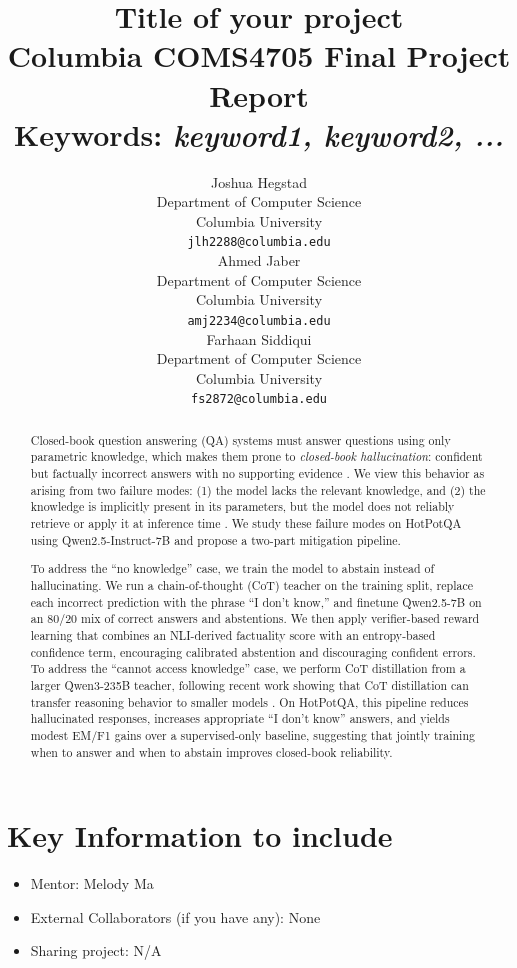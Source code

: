 \documentclass{article}
\title{
  Title of your project \\
  \vspace{1em}
  \small{\normalfont Columbia COMS4705 Final Project Report} \\
  \small{\normalfont \textbf{Keywords:} \textit{keyword1, keyword2, ...}}
}
\author{
  Joshua Hegstad \\
  Department of Computer Science \\
  Columbia University \\
  \texttt{jlh2288@columbia.edu} \\
  \And
  Ahmed Jaber \\
  Department of Computer Science \\
  Columbia University \\
  \texttt{amj2234@columbia.edu} \\
  \And
  Farhaan Siddiqui \\
  Department of Computer Science \\
  Columbia University \\
  \texttt{fs2872@columbia.edu} \\
}
\newcommand{\note}[1]{\textcolor{blue}{{#1}}}
\begin{document}
\maketitle


\begin{abstract}
Closed-book question answering (QA) systems must answer questions using only parametric knowledge, which makes them prone to \emph{closed-book hallucination}: confident but factually incorrect answers with no supporting evidence \cite{ji2023survey}. We view this behavior as arising from two failure modes: (1) the model lacks the relevant knowledge, and (2) the knowledge is implicitly present in its parameters, but the model does not reliably retrieve or apply it at inference time \cite{kadavath2022language,lin2022teaching}. We study these failure modes on HotPotQA using Qwen2.5-Instruct-7B and propose a two-part mitigation pipeline.

To address the ``no knowledge'' case, we train the model to abstain instead of hallucinating. We run a chain-of-thought (CoT) teacher on the training split, replace each incorrect prediction with the phrase ``I don't know,'' and finetune Qwen2.5-7B on an 80/20 mix of correct answers and abstentions. We then apply verifier-based reward learning that combines an NLI-derived factuality score with an entropy-based confidence term, encouraging calibrated abstention and discouraging confident errors. To address the ``cannot access knowledge'' case, we perform CoT distillation from a larger Qwen3-235B teacher, following recent work showing that CoT distillation can transfer reasoning behavior to smaller models \cite{li2023cotdistill}. On HotPotQA, this pipeline reduces hallucinated responses, increases appropriate ``I don't know'' answers, and yields modest EM/F1 gains over a supervised-only baseline, suggesting that jointly training when to answer and when to abstain improves closed-book reliability.
\end{abstract}




\section{Key Information to include}
\begin{itemize}
    \item Mentor: Melody Ma
    \item External Collaborators (if you have any): None
    \item Sharing project: N/A
\end{itemize}
\end{document}
